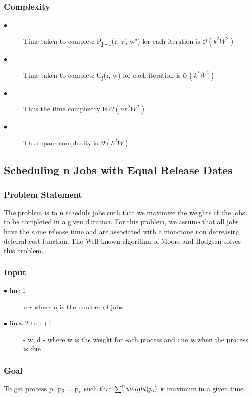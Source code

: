 \documentclass[11pt]{article}
\begin{document}
{				\subsubsection{Complexity}
				\begin{description}
					\item[$\bullet$] Time taken to complete P\textsubscript{j - 1}(r, r', w") for each iteration is $\mathcal{O}(k^2W^2)$ \citet{Lawler1990}
					\item[$\bullet$] Time taken to complete C\textsubscript{j}(r, w) for each iteration is $\mathcal{O}(k^2W^2)$ \citet{Lawler1990}
					\item[$\bullet$] Thus the time complexity is $\mathcal{O}(nk^2W^2)$ \citet{Lawler1990}
					\item[$\bullet$] Thus space complexity is $\mathcal{O}(k^2W)$ \citet{Lawler1990}
				\end{description}
				
				\subsection{Scheduling n Jobs with Equal Release Dates}
				\subsubsection{Problem Statement}
				The problem is to n schedule jobs such that we maximize the weights of the jobs to be completed in a given duration. For this problem, we assume that all jobs have the same release time and are associated with a monotone non decreasing deferral cost function. The Well known algorithm of Moore and Hodgson solves this problem. \citet{doi:10.1287/mnsc.15.1.102}
				
				\subsubsection{Input}
				\begin{description}
					\item[$\bullet$ line 1]  n - where n is the number of jobs
					\item[$\bullet$ lines 2 to n+1] - w, d - where w is the weight for each process and due is when the process is due
				\end{description}
				
				\subsubsection{Goal}
				To get process p\textsubscript{1} p\textsubscript{2} ... p\textsubscript{n} such that $\sum_{1}^{n} weight (p\textsubscript{i})$ is maximum in a given time.
				
}
\end{document}
